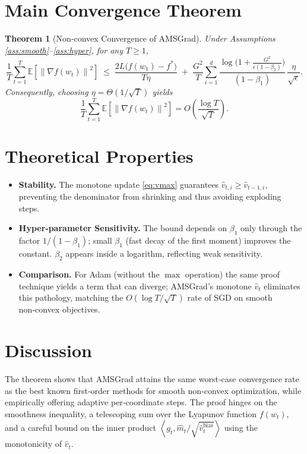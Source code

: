 \documentclass{article}
\newtheorem{theorem}{Theorem}
\newcommand{\E}{\mathbb{E}}
\newcommand{\norm}[1]{\left\|#1\right\|}
\newcommand{\ip}[2]{\left\langle #1,#2\right\rangle}
\begin{document}
\section*{Main Convergence Theorem}
\begin{theorem}[Non‑convex Convergence of AMSGrad]\label{thm:main}
Under Assumptions \ref{ass:smooth}–\ref{ass:hyper}, for any $T\ge 1$,
\[
\frac{1}{T}\sum_{t=1}^{T}\E\!\left[\norm{\nabla f(w_t)}^{2}\right]
\;\le\;
\frac{2L\bigl(f(w_1)-f^{*}\bigr)}{T\eta}
\;+\;
\frac{G^{2}}{T}\sum_{i=1}^{d}\frac{\log\!\bigl(1+\frac{G^{2}}{\epsilon (1-\beta_2)}\bigr)}{(1-\beta_1)}\,
\frac{\eta}{\sqrt{\epsilon}} .
\]
Consequently, choosing $\eta = \Theta(1/\sqrt{T})$ yields
\[
\frac{1}{T}\sum_{t=1}^{T}\E\!\left[\norm{\nabla f(w_t)}^{2}\right]=O\!\left(\frac{\log T}{\sqrt{T}}\right).
\]
\end{theorem}

\section*{Theoretical Properties}
\begin{itemize}
\item \textbf{Stability.} The monotone update \eqref{eq:vmax} guarantees $\hat v_{t,i}\ge \hat v_{t-1,i}$, preventing the denominator from shrinking and thus avoiding exploding steps.
\item \textbf{Hyper‑parameter Sensitivity.} The bound depends on $\beta_1$ only through the factor $1/(1-\beta_1)$; small $\beta_1$ (fast decay of the first moment) improves the constant. $\beta_2$ appears inside a logarithm, reflecting weak sensitivity.
\item \textbf{Comparison.} For Adam (without the $\max$ operation) the same proof technique yields a term that can diverge; AMSGrad’s monotone $\hat v_t$ eliminates this pathology, matching the $O(\log T/\sqrt{T})$ rate of SGD on smooth non‑convex objectives.
\end{itemize}

\section*{Discussion}
The theorem shows that AMSGrad attains the same worst‑case convergence rate as the best known first‑order methods for smooth non‑convex optimization, while empirically offering adaptive per‑coordinate steps. The proof hinges on the smoothness inequality, a telescoping sum over the Lyapunov function $f(w_t)$, and a careful bound on the inner product $\ip{g_t}{\hat m_t/\sqrt{\hat v_t^{\text{bias}}}}$ using the monotonicity of $\hat v_t$.
\end{document}
